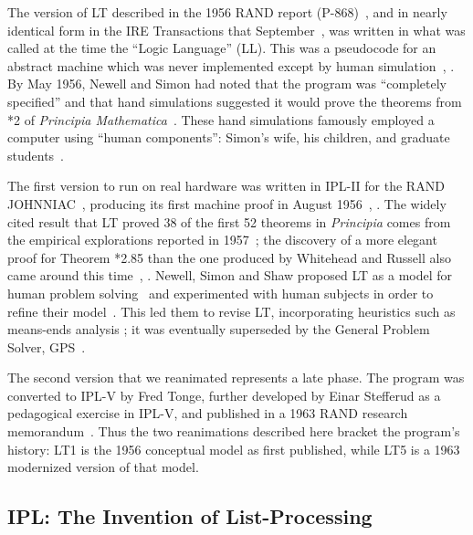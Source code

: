 \documentclass[journal]{IEEEtran}
\begin{document}
The version of LT described in the 1956 RAND report
(P-868)~\cite{LT1956a,LT1956b}, and in nearly identical form in the
IRE Transactions that September~\cite{LT1956c}, was written in what
was called at the time the ``Logic Language'' (LL).  This was a
pseudocode for an abstract machine which was never implemented
except by human simulation~\cite[Ch.~13]{simon1996models}, 
\cite[p.~xx]{newell1964ipl}.  By May
1956, Newell and Simon had noted that the program was ``completely
specified'' and that hand simulations suggested it would prove the
theorems from *2 of \textit{Principia
Mathematica}~\cite[p.~18]{cip1956}.  These hand simulations famously
employed a computer using ``human components'': Simon's wife, his children, and
graduate students~\cite[Ch.~13]{simon1996models}.

The first version to run on real hardware was written in IPL-II for
the RAND JOHNNIAC~\cite{newellshaw1957},
producing its first machine proof in August
1956~\cite[Ch.~13]{simon1996models}, \cite{newellshaw1957}. The widely cited result
that LT proved 38 of the first 52 theorems in \textit{Principia} comes 
from the empirical explorations reported in 1957~\cite{LT1957};
the discovery of a more elegant proof for Theorem *2.85 than the 
one produced by Whitehead and Russell also came around this 
time~\cite[Ch.~13]{simon1996models}, \cite{cip8jan1958}.
Newell, Simon and Shaw proposed LT as a model 
for human problem solving~\cite{HPS1958}
and experimented with human subjects in order to refine
their model~\cite{PCT1959}.  This led them to revise
LT, incorporating heuristics such as means-ends
analysis \cite{PCT1959}; it was eventually
superseded by the General Problem Solver,
GPS~\cite[p.~19]{SHT1959}.

The second version that we reanimated represents a late phase.
The program was converted to IPL-V by Fred Tonge, further developed
by Einar Stefferud as a pedagogical exercise in IPL-V, and published
in a 1963 RAND research memorandum~\cite[Section~I]{stefferud1963lt}.
Thus the two reanimations described here bracket the program's
history: LT1 is the 1956 conceptual model as first published, while
LT5 is a 1963 modernized version of that model.

\subsection{IPL: The Invention of List-Processing}
\end{document}
